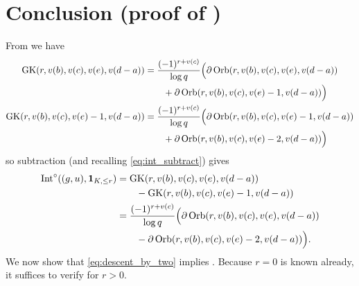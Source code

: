 \section{Conclusion (proof of )}
From  we have
\begin{align*}
  \operatorname{GK}(r, v(b), v(c), v(e), v(d-a))
  &= \frac{(-1)^{r+v(c)}}{\log q} \Big(
      \partial \operatorname{Orb}(r, v(b), v(c), v(e), v(d-a)) \\
      &\qquad + \partial \operatorname{Orb}(r, v(b), v(c), v(e)-1, v(d-a))
    \Big) \\
  \operatorname{GK}(r, v(b), v(c), v(e)-1, v(d-a))
  &= \frac{(-1)^{r+v(c)}}{\log q} \Big(
      \partial \operatorname{Orb}(r, v(b), v(c), v(e)-1, v(d-a)) \\
      &\qquad + \partial \operatorname{Orb}(r, v(b), v(c), v(e)-2, v(d-a))
    \Big)
\end{align*}
so subtraction (and recalling \eqref{eq:int_subtract}) gives
\begin{equation}
  \begin{aligned}
    \operatorname{Int}^\circ((g,u), \mathbf{1}_{K, \le r})
    &= \operatorname{GK}(r, v(b), v(c), v(e), v(d-a)) \\
    &\qquad- \operatorname{GK}(r, v(b), v(c), v(e)-1, v(d-a)) \\
    &= \frac{(-1)^{r+v(c)}}{\log q} \Big(
        \partial \operatorname{Orb}(r, v(b), v(c), v(e), v(d-a)) \\
        &\qquad- \partial \operatorname{Orb}(r, v(b), v(c), v(e)-2, v(d-a))
      \Big).
  \end{aligned}
  \label{eq:descent_by_two}
\end{equation}
We now show that \eqref{eq:descent_by_two} implies .
Because $r = 0$ is known already, it suffices to verify for $r > 0$.

